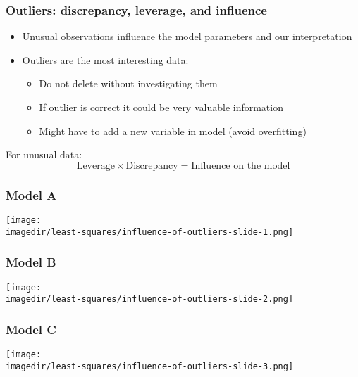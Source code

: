 \begin{frame}\frametitle{Outliers: discrepancy, leverage, and influence}
	\begin{itemize}
		\item	Unusual observations influence the model parameters and our interpretation
		\item	Outliers are the most interesting data:
		\begin{itemize}
			\item	Do not delete without investigating them
			\item	If outlier is correct it could be very valuable information
			\item	Might have to add a new variable in model (avoid overfitting)
		\end{itemize}
	\end{itemize}

	\vspace{12pt}
	\begin{exampleblock}{For unusual data: }
		$$\text{Leverage} \times \text{Discrepancy} = \text{Influence on the model} $$
	\end{exampleblock}
\end{frame}

\begin{frame}\frametitle{Model A}
	\begin{center}
		\texttt{[image: \\imagedir/least-squares/influence-of-outliers-slide-1.png]}
	\end{center}
\end{frame}

\begin{frame}\frametitle{Model B}
	\begin{center}
		\texttt{[image: \\imagedir/least-squares/influence-of-outliers-slide-2.png]}
	\end{center}
\end{frame}

\begin{frame}\frametitle{Model C}
	\begin{center}
		\texttt{[image: \\imagedir/least-squares/influence-of-outliers-slide-3.png]}
	\end{center}
\end{frame}

